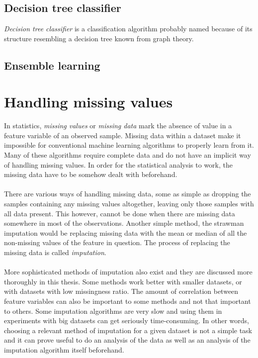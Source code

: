 \documentclass[11pt]{article}
\begin{document}
    \subsection{Decision tree classifier}
      {\it Decision tree classifier} is a classification algorithm probably named because of its structure resembling a decision tree known from graph theory.
    \subsection{Ensemble learning}
  \newpage
  \section{Handling missing values}
    In statistics, {\it missing values} or {\it missing data} mark the absence of value in a feature variable of an observed sample. Missing data within a dataset make it impossible for conventional machine learning algorithms to properly learn from it. Many of these algorithms require complete data and do not have an implicit way of handling missing values. In order for the statistical analysis to work, the missing data have to be somehow dealt with beforehand. \citep{otfi}
    \\~\\
    There are various ways of handling missing data, some as simple as dropping the samples containing any missing values altogether, leaving only those samples with all data present. \citep{lwd} This however, cannot be done when there are missing data somewhere in most of the observations. Another simple method, the strawman imputation \citep{otfi} would be replacing missing data with the mean or median of all the non-missing values of the feature in question. The process of replacing the missing data is called {\it imputation}.
    \\~\\
    More sophisticated methods of imputation also exist and they are discussed more thoroughly in this thesis. Some methods work better with smaller datasets, or with datasets with low missingness ratio. The amount of correlation between feature variables can also be important to some methods and not that important to others. \citep{otfi} Some imputation algorithms are very slow and using them in experiments with big datasets can get seriously time-consuming. In other words, choosing a relevant method of imputation for a given dataset is not a simple task and it can prove useful to do an analysis of the data as well as an analysis of the imputation algorithm itself beforehand.
\end{document}
